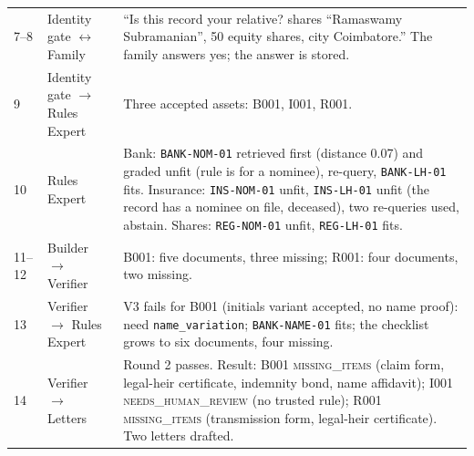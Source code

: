 {\begin{longtable}{@{}l p{2.5cm} p{9.0cm}@{}}
7--8 & Identity gate $\leftrightarrow$ Family & ``Is this record your relative? shares ``Ramaswamy Subramanian'', 50 equity shares, city Coimbatore.'' The family answers yes; the answer is stored. \\
9 & Identity gate $\to$ Rules Expert & Three accepted assets: B001, I001, R001. \\
10 & Rules Expert & Bank: \texttt{BANK-NOM-01} retrieved first (distance 0.07) and graded unfit (rule is for a nominee), re-query, \texttt{BANK-LH-01} fits. Insurance: \texttt{INS-NOM-01} unfit, \texttt{INS-LH-01} unfit (the record has a nominee on file, deceased), two re-queries used, abstain. Shares: \texttt{REG-NOM-01} unfit, \texttt{REG-LH-01} fits. \\
11--12 & Builder $\to$ Verifier & B001: five documents, three missing; R001: four documents, two missing. \\
13 & Verifier $\to$ Rules Expert & V3 fails for B001 (initials variant accepted, no name proof): need \texttt{name\_variation}; \texttt{BANK-NAME-01} fits; the checklist grows to six documents, four missing. \\
14 & Verifier $\to$ Letters & Round 2 passes. Result: B001 \textsc{missing\_items} (claim form, legal-heir certificate, indemnity bond, name affidavit); I001 \textsc{needs\_human\_review} (no trusted rule); R001 \textsc{missing\_items} (transmission form, legal-heir certificate). Two letters drafted. \\ \bottomrule
\end{longtable}}
